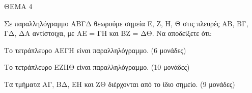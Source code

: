 
ΘΕΜΑ 4

Σε παραλληλόγραμμο ΑΒΓΔ θεωρούμε σημεία Ε, Ζ, Η, Θ στις πλευρές ΑΒ, ΒΓ, ΓΔ, ΔΑ αντίστοιχα, με ΑΕ = ΓΗ και ΒΖ = ΔΘ. Να αποδείξετε ότι:

\begin{alist}
\item Το τετράπλευρο ΑΕΓΗ είναι παραλληλόγραμμο. (6 μονάδες)

\item Το τετράπλευρο ΕΖΗΘ είναι παραλληλόγραμμο. (10 μονάδες)

\item Τα τμήματα ΑΓ, ΒΔ, ΕΗ και ΖΘ διέρχονται από το ίδιο σημείο. (9 μονάδες)


\end{alist}
